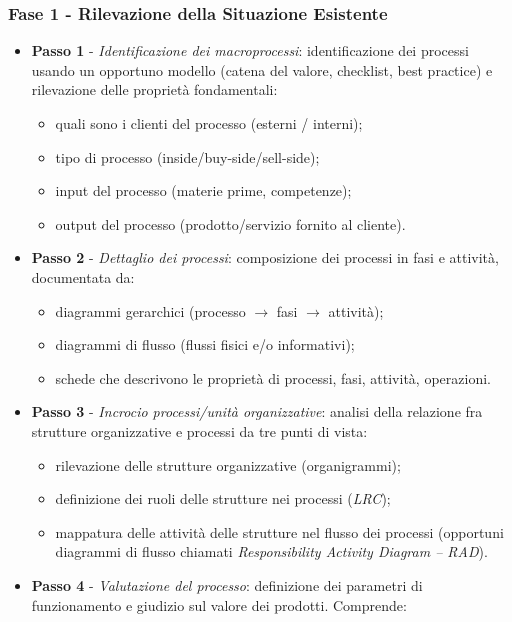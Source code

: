 \documentclass[a4paper, notitlepage, 9pt]{extreport}
\begin{document}
\subsubsection*{Fase 1 - Rilevazione della Situazione Esistente}
\begin{itemize}
	\item \textbf{Passo 1} - \textit{Identificazione dei
	macroprocessi}: identificazione dei processi usando un opportuno modello (catena del valore, checklist, best practice) e rilevazione delle proprietà fondamentali:
	\begin{itemize}
		\item quali sono i clienti del processo (esterni / interni);
		\item tipo di processo (inside/buy-side/sell-side);
		\item input del processo (materie prime, competenze);
		\item output del processo (prodotto/servizio fornito al cliente).
	\end{itemize}
	\item \textbf{Passo 2} - \textit{Dettaglio dei processi}: composizione dei processi in fasi e attività,
	documentata da:
	\begin{itemize}
		\item diagrammi gerarchici (processo $\rightarrow$ fasi $\rightarrow$ attività);
		\item diagrammi di flusso (flussi fisici e/o informativi);
		\item schede che descrivono le proprietà di processi, fasi, attività, operazioni.
	\end{itemize}
	\item \textbf{Passo 3} - \textit{Incrocio processi/unità
		organizzative}: analisi della relazione fra strutture organizzative e processi da tre punti di vista:
	\begin{itemize}
		\item rilevazione delle strutture organizzative (organigrammi);
		\item definizione dei ruoli delle strutture nei processi (\textit{LRC});
		\item mappatura delle attività delle strutture nel flusso dei processi (opportuni diagrammi di flusso chiamati \textit{Responsibility Activity Diagram – RAD}).
	\end{itemize}
	\item \textbf{Passo 4} - \textit{Valutazione del processo}: definizione dei parametri di funzionamento e giudizio sul valore dei prodotti. Comprende:

\end{itemize}
\end{document}
